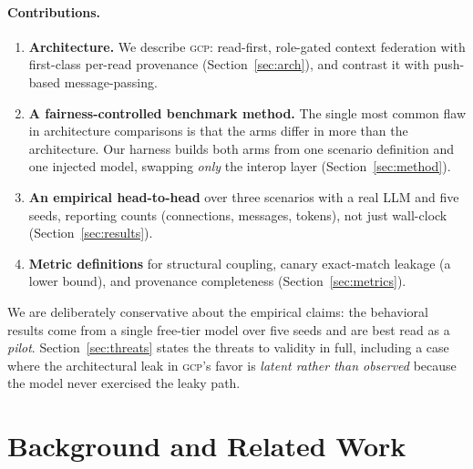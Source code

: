 \documentclass[10pt,twocolumn,letterpaper]{article}
\newcommand{\gcp}{\textsc{gcp}}
\begin{document}
\paragraph{Contributions.}
\begin{enumerate}
  \item \textbf{Architecture.} We describe \gcp{}: read-first, role-gated context federation with
  first-class per-read provenance (Section~\ref{sec:arch}), and contrast it with push-based
  message-passing.
  \item \textbf{A fairness-controlled benchmark method.} The single most common flaw in
  architecture comparisons is that the arms differ in more than the architecture. Our harness
  builds both arms from one scenario definition and one injected model, swapping \emph{only} the
  interop layer (Section~\ref{sec:method}).
  \item \textbf{An empirical head-to-head} over three scenarios with a real LLM and five seeds,
  reporting counts (connections, messages, tokens), not just wall-clock (Section~\ref{sec:results}).
  \item \textbf{Metric definitions} for structural coupling, canary exact-match leakage (a lower
  bound), and provenance completeness (Section~\ref{sec:metrics}).
\end{enumerate}

We are deliberately conservative about the empirical claims: the behavioral results come from a
single free-tier model over five seeds and are best read as a \emph{pilot}. Section~\ref{sec:threats}
states the threats to validity in full, including a case where the architectural leak in \gcp{}'s
favor is \emph{latent rather than observed} because the model never exercised the leaky path.

\section{Background and Related Work}
\label{sec:related}
\end{document}
